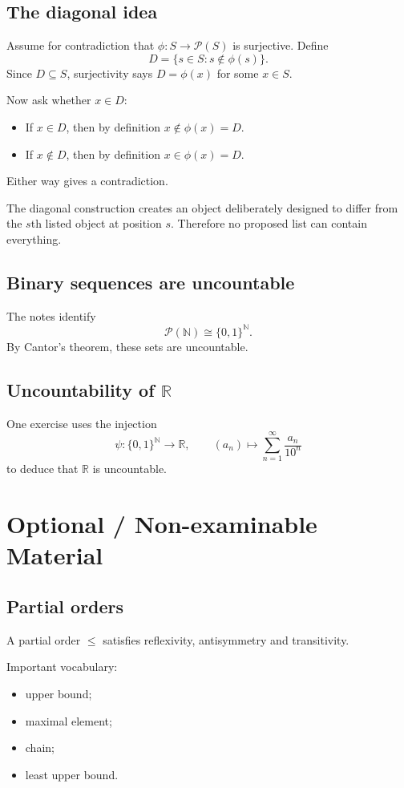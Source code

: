 \documentclass[11pt,a4paper]{article}
\newcommand{\R}{\mathbb{R}}
\newcommand{\N}{\mathbb{N}}
\newcommand{\PP}{\mathcal{P}}
\begin{document}
\subsection{The diagonal idea}
Assume for contradiction that $\phi:S\to\PP(S)$ is surjective. Define
\[
D=\{s\in S:s\notin\phi(s)\}.
\]
Since $D\subseteq S$, surjectivity says $D=\phi(x)$ for some $x\in S$.

Now ask whether $x\in D$:
\begin{itemize}
\item If $x\in D$, then by definition $x\notin\phi(x)=D$.
\item If $x\notin D$, then by definition $x\in\phi(x)=D$.
\end{itemize}
Either way gives a contradiction.

\begin{keybox}
The diagonal construction creates an object deliberately designed to differ from the $s$th listed object at position $s$. Therefore no proposed list can contain everything.
\end{keybox}

\subsection{Binary sequences are uncountable}
The notes identify
\[
\PP(\N)\cong \{0,1\}^{\N}.
\]
By Cantor's theorem, these sets are uncountable.

\subsection{Uncountability of $\R$}
One exercise uses the injection
\[
\psi:\{0,1\}^{\N}\to\R,\qquad (a_n)\mapsto\sum_{n=1}^\infty\frac{a_n}{10^n}
\]
to deduce that $\R$ is uncountable.

\section{Optional / Non-examinable Material}

\subsection{Partial orders}
A partial order $\le$ satisfies reflexivity, antisymmetry and transitivity.

Important vocabulary:
\begin{itemize}
\item upper bound;
\item maximal element;
\item chain;
\item least upper bound.
\end{itemize}
\end{document}
